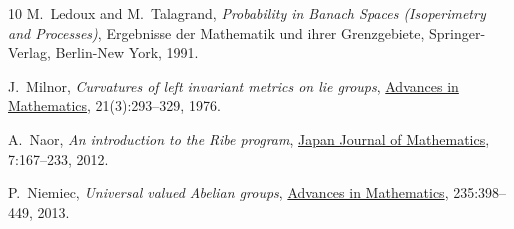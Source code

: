 \documentclass[11pt,a4paper,reqno]{amsart}
\numberwithin{equation}{section}
\theoremstyle{plain}
\theoremstyle{definition}
\begin{document}
\begin{thebibliography}{10}
M.~Ledoux and M.~Talagrand, {\em Probability in Banach Spaces
  (Isoperimetry and Processes)}, Ergebnisse der Mathematik und ihrer
  Grenzgebiete, Springer-Verlag, Berlin-New York, 1991.

J.~Milnor, {\em Curvatures of left invariant metrics on lie groups},
  \href{http://dx.doi.org/10.1016/S0001-8708(76)80002-3}{Advances in
  Mathematics}, 21(3):293--329, 1976.

A.~Naor, {\em An introduction to the Ribe program},
  \href{http://dx.doi.org/10.1007/s11537-012-1222-7}{Japan Journal of
  Mathematics}, 7:167--233, 2012.

P.~Niemiec, {\em Universal valued Abelian groups},
  \href{http://dx.doi.org/10.1016/j.aim.2012.12.005}{Advances in
  Mathematics}, 235:398--449, 2013.
\end{thebibliography}
\end{document}
